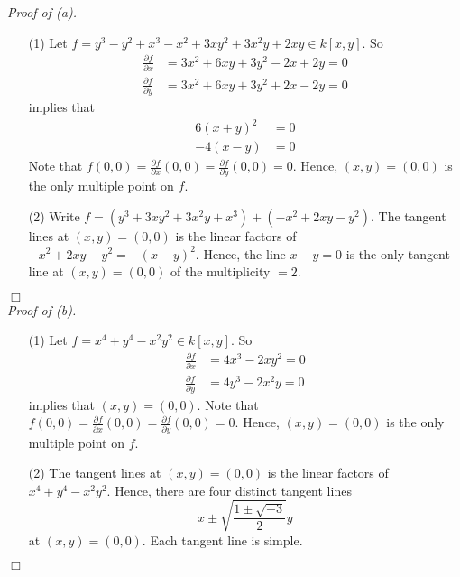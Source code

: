 \documentclass{article}
\begin{document}
\emph{Proof of (a).}
\begin{enumerate}
\item[(1)]
  Let $f = y^3 - y^2 + x^3 - x^2 + 3xy^2 + 3x^2y + 2xy \in k[x,y]$.
  So
  \begin{align*}
    \frac{\partial f}{\partial x} &= 3x^2 + 6xy + 3y^2 - 2x + 2y = 0 \\
    \frac{\partial f}{\partial y} &= 3x^2 + 6xy + 3y^2 + 2x - 2y = 0
  \end{align*}
  implies that
  \begin{align*}
    6(x+y)^2 &= 0 \\
    -4(x - y) &= 0
  \end{align*}
  Note that
  $f(0,0) = \frac{\partial f}{\partial x}(0,0) = \frac{\partial f}{\partial y}(0,0) = 0$.
  Hence, $(x,y) = (0,0)$ is the only multiple point on $f$.

\item[(2)]
  Write $f = (y^3 + 3xy^2 + 3x^2y + x^3) + (-x^2 + 2xy - y^2)$.
  The tangent lines at $(x,y) = (0,0)$ is the linear factors of
  $-x^2 + 2xy - y^2 = -(x-y)^2$.
  Hence, the line $x - y = 0$ is the only tangent line at $(x,y) = (0,0)$
  of the multiplicity $= 2$.
\end{enumerate}
$\Box$ \\



\emph{Proof of (b).}
\begin{enumerate}
\item[(1)]
  Let $f = x^4 + y^4 - x^2y^2 \in k[x,y]$.
  So
  \begin{align*}
    \frac{\partial f}{\partial x} &= 4x^3 - 2xy^2 = 0 \\
    \frac{\partial f}{\partial y} &= 4y^3 - 2x^2y = 0
  \end{align*}
  implies that $(x,y) = (0,0)$.
  Note that
  $f(0,0) = \frac{\partial f}{\partial x}(0,0) = \frac{\partial f}{\partial y}(0,0) = 0$.
  Hence, $(x,y) = (0,0)$ is the only multiple point on $f$.

\item[(2)]
  The tangent lines at $(x,y) = (0,0)$ is the linear factors of
  $x^4 + y^4 - x^2y^2$.
  Hence, there are four distinct tangent lines
  \[
    x \pm \sqrt{\frac{1 \pm \sqrt{-3}}{2}} y
  \]
  at $(x,y) = (0,0)$.
  Each tangent line is simple.
\end{enumerate}
$\Box$ \\
\end{document}
